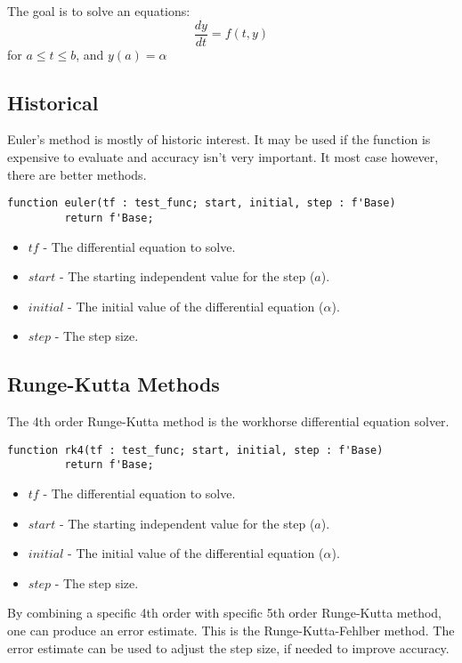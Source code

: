 \documentclass[10pt, openany]{book}
\begin{document}
The goal is to solve an equations:
\begin{displaymath}
  \frac{dy}{dt} = f(t, y)
\end{displaymath}
 for $a\leq t\leq b$, and $y(a) = \alpha$
 
\subsection{Historical}
Euler's method is mostly of historic interest.  It may be used if the function is expensive to evaluate and accuracy isn't very important.  It most case however, there are better methods.

\begin{lstlisting}
function euler(tf : test_func; start, initial, step : f'Base)
         return f'Base;
\end{lstlisting}
\begin{itemize}
  \item $tf$ - The differential equation to solve.
  \item $start$ - The starting independent value for the step ($a$).
  \item $initial$ - The initial value of the differential equation ($\alpha$).
  \item $step$ - The step size.
\end{itemize}

\subsection{Runge-Kutta Methods}
The 4th order Runge-Kutta method is the workhorse differential equation solver.

\begin{lstlisting}
function rk4(tf : test_func; start, initial, step : f'Base)
         return f'Base;
\end{lstlisting}
\begin{itemize}
  \item $tf$ - The differential equation to solve.
  \item $start$ - The starting independent value for the step ($a$).
  \item $initial$ - The initial value of the differential equation ($\alpha$).
  \item $step$ - The step size.
\end{itemize}

By combining a specific 4th order with specific 5th order Runge-Kutta method, one can produce an error estimate.  This is the Runge-Kutta-Fehlber method.  The error estimate can be used to adjust the step size, if needed to improve accuracy.
\end{document}
